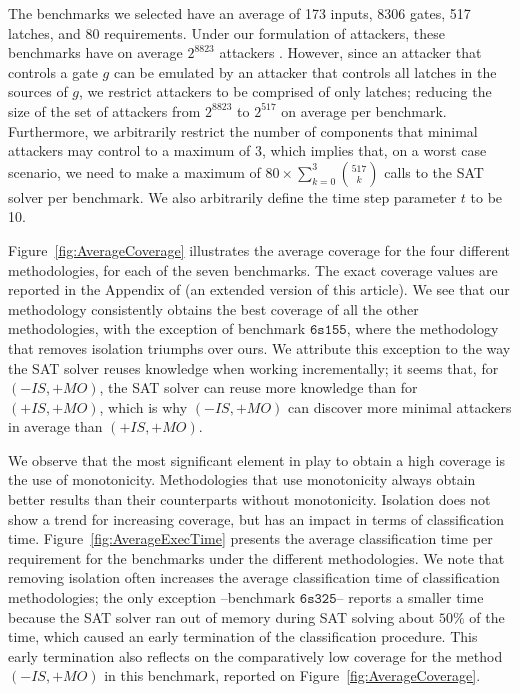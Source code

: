 {{The benchmarks we selected have an average of 173 inputs, 8306 gates, 517 latches, and 80 requirements. } Under our formulation of attackers, these benchmarks have on average $2^{8823}$ attackers%
. However, since an attacker that controls a gate $g$ can be emulated by an attacker that controls all latches in the sources of $g$, we restrict attackers to be comprised of only latches; reducing the size of the set of attackers from $2^{8823}$ to $2^{517}$ on average per benchmark. Furthermore, we arbitrarily restrict the number of components that minimal attackers may control to a maximum of 3, which implies that, on a worst case scenario, we need to make a maximum of $80\times\sum_{k=0}^3 \binom {517}k$ calls to the SAT solver per benchmark. We also arbitrarily define the time step parameter $t$ to be 10.

Figure~\ref{fig:AverageCoverage} illustrates the average coverage for the four different methodologies, for each of the seven benchmarks. The exact coverage values are reported in the Appendix of \cite{aig-ac-arxiv} (an extended version of this article). We see that our methodology consistently obtains the best coverage of all the other methodologies, with the exception of benchmark $\mathtt{6s155}$, where the methodology that removes isolation triumphs over ours. We attribute this exception to the way the SAT solver reuses knowledge when working incrementally; it seems that, for $(-IS,+MO)$, the SAT solver can reuse more knowledge than for $(+IS,+MO)$, which is why $(-IS,+MO)$ can discover more minimal attackers in average than $(+IS,+MO)$. 


We observe that the most significant element in play to obtain a high coverage is the use of monotonicity. Methodologies that use monotonicity always obtain better results than their counterparts without monotonicity. Isolation does not show a trend for increasing coverage, but has an impact in terms of classification time. Figure~\ref{fig:AverageExecTime} presents the average classification time per requirement for the benchmarks under the different methodologies. We note that removing isolation often increases the average classification time of classification methodologies; the only exception --benchmark $\mathtt{6s325}$-- reports a smaller time because the SAT solver ran out of memory during SAT solving about $50\%$ of the time, which caused an early termination of the classification procedure. This early termination also reflects on the comparatively low coverage for the method $(-IS,+MO)$ in this benchmark, reported on Figure~\ref{fig:AverageCoverage}.

}
